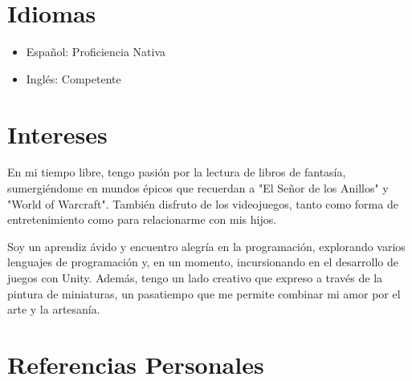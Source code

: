 \documentclass[a4paper,10pt]{article}
\begin{document}
\section*{Idiomas}
\begin{itemize}
    \item Español: Proficiencia Nativa
    \item Inglés: Competente
\end{itemize}

\section*{Intereses}
En mi tiempo libre, tengo pasión por la lectura de libros de fantasía, sumergiéndome en mundos épicos que recuerdan a "El Señor de los Anillos" y "World of Warcraft". También disfruto de los videojuegos, tanto como forma de entretenimiento como para relacionarme con mis hijos.

Soy un aprendiz ávido y encuentro alegría en la programación, explorando varios lenguajes de programación y, en un momento, incursionando en el desarrollo de juegos con Unity. Además, tengo un lado creativo que expreso a través de la pintura de miniaturas, un pasatiempo que me permite combinar mi amor por el arte y la artesanía.


\section*{Referencias Personales}
\renewcommand{\refname}{}
\end{document}
